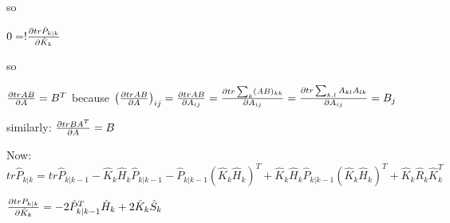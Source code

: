 \documentclass{notebook}
\begin{document}
so

$0 =! \pdv{tr \hat{P}_{k|k}}{\hat{K}_k}$

so

$\pdv{tr AB}{A} = B^T$ because $\left( \pdv{tr AB}{A} \right)_{ij} = \pdv{tr AB}{A_{ij}} = \pdv{tr \sum_k (AB)_{kk}}{A_{ij}} = \pdv{tr \sum_{k,l} A_{kl}A_{lk}}{A_{ij}} = B_j$

similarly: $\pdv{tr BA^T}{A} = B$

Now: $tr \hat{P}_{k|k} = tr \hat{P}_{k|k-1} - \hat{K}_k \hat{H}_k \hat{P}_{k|k-1} - \hat{P}_{k|k-1}(\hat{K}_k \hat{H}_k)^T 
+ \hat{K}_k \hat{H}_k \hat{P}_{k|k-1} (\hat{K}_k \hat{H}_k)^T + \hat{K}_k \hat{R}_k\hat{K}^T_k$

$\pdv{tr P_{k|k}}{\hat{K}_k} = - 2 \hat{P}^T_{k|k-1} \hat{H}_k + 2 \hat{K}_k \hat{S}_k$




\nocite{*}
\renewcommand*{\bibfont}{\small}
\printbibliography[heading=bibintoc]
\end{document}
